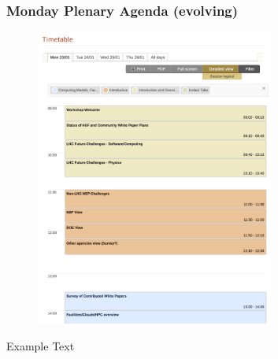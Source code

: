 \begin{frame}
\frametitle{Monday Plenary Agenda (evolving)}

\begin{figure}[htbp]
\begin{center}
\includegraphics[width=0.7\textwidth]{images/20161214-HSF-SDSC-Workshop-1.png}
\end{center}
\end{figure}

\small{Example Text}

\end{frame}



